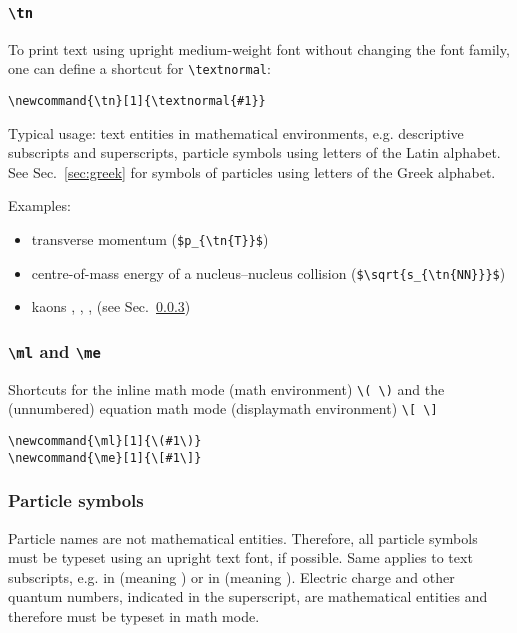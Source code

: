 \documentclass[12pt,a4paper]{article}
\begin{document}
\cprotect\subsubsection{\verb_\tn_}

To print text using upright medium-weight font without changing the font family, one can define a shortcut for \verb_\textnormal_:
\begin{verbatim}
\newcommand{\tn}[1]{\textnormal{#1}}
\end{verbatim}
Typical usage: text entities in mathematical environments, e.g. descriptive subscripts and superscripts, particle symbols using letters of the Latin alphabet.
See Sec.~\ref{sec:greek} for symbols of particles using letters of the Greek alphabet.

Examples:
\begin{itemize}
\item transverse momentum  (\verb!$p_{\tn{T}}$!)
\item centre-of-mass energy of a nucleus--nucleus collision  (\verb!$\sqrt{s_{\tn{NN}}}$!)
\item kaons \kaonplus, \kaonminus, \kzeros, \kzerol{} (see Sec.~\ref{sec:particles})
\end{itemize}

\cprotect\subsubsection{\verb_\ml_ and \verb_\me_}

Shortcuts for the inline math mode (math environment) \verb_\( \)_ and the (unnumbered) equation math mode (displaymath environment) \verb_\[ \]_
\begin{verbatim}
\newcommand{\ml}[1]{\(#1\)}
\newcommand{\me}[1]{\[#1\]}
\end{verbatim}

\subsubsection{Particle symbols}
\label{sec:particles}

Particle names are not mathematical entities.
Therefore, all particle symbols must be typeset using an upright text font, if possible.
Same applies to text subscripts, e.g.  in \qm{\lmbc} (meaning ) or  in \qm{\kzeros{}} (meaning ).
Electric charge and other quantum numbers, indicated in the superscript, are mathematical entities and therefore must be typeset in math mode.
\end{document}

